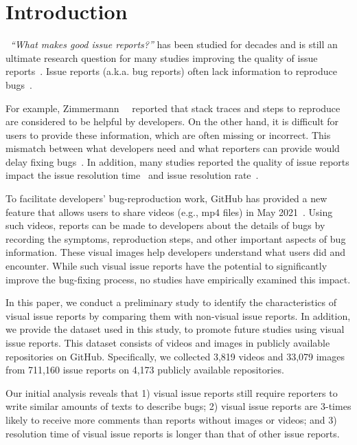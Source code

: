 \section{Introduction}
\label{sec:intro}
~{\it ``What makes good issue reports?''} has been studied for decades and is still an ultimate research question for many studies improving the quality of issue reports~\citep{TODO}. Issue reports (a.k.a. bug reports) often lack information to reproduce bugs~\citep{DBLP:conf/msr/JoorabchiMM14}\citep{DearGitHub}. 

For example, Zimmermann~\et~\citep{zimmermann2010TSE} reported  that  stack traces and steps to reproduce are considered to be helpful by developers. On the other hand, it is difficult for users to provide these information, which are often missing or incorrect. 
This mismatch between what developers need and what reporters can provide would delay fixing bugs~\citep{DBLP:conf/msr/JoorabchiMM14}. In addition, many studies reported the quality of issue reports impact the issue resolution time~\citep{DBLP:conf/cscw/BreuPSZ10}\citep{DBLP:conf/icse/GuoZNM10} and issue resolution rate~\citep{DBLP:conf/compsac/ZouXZCL15}\citep{DBLP:conf/icse/ZimmermannNGM12}. 

To facilitate developers' bug-reproduction work, GitHub has provided a new feature that allows users to share videos (e.g., mp4 files) in May 2021~\citep{github-video-blog}. Using such videos, reports can be made to developers about the details of bugs by recording the symptoms, reproduction steps, and other important aspects of bug information. These visual images help developers understand what users did and encounter. While such visual issue reports have the potential to significantly improve the bug-fixing process, no studies have empirically examined this impact. 

In this paper, we conduct a preliminary study to identify the characteristics of visual issue reports by comparing them with non-visual issue reports.  In addition, we provide the dataset used in this study, to promote future studies using visual issue reports. This dataset consists of videos and images in publicly available repositories on GitHub. Specifically, we collected 3,819 videos and 33,079 images from 711,160 issue reports on 4,173 publicly available repositories.


Our initial analysis reveals that 1) visual issue reports still require reporters to write similar amounts of texts to describe bugs; 2) visual issue reports are 3-times likely to receive more comments than reports without images or videos; and 3) resolution time of visual issue reports is longer than that of other issue reports. 
